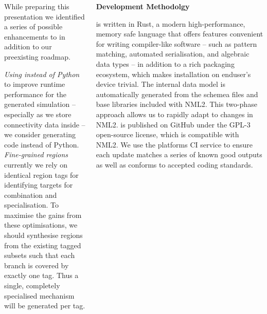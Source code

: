 \documentclass{beamer}
\begin{document}
\begin{frame}[t, fragile]
\begin{columns}
\begin{column}{0.73\textwidth}
\begin{columns}[t]
\begin{column}[t]{0.49\textwidth}
          While preparing this presentation we identified a series of possible
          enhancements to \nmlcc{} in addition to our preexisting roadmap.

          \emph{Using \cppemph{} instead of Python} to improve runtime performance for the
          generated simulation -- especially as we store connectivity data inside --
          we consider generating \cpp{} code instead of Python.\\[1.5ex]
          \emph{Fine-grained regions} currently we rely on identical region tags for
          identifying targets for combination and specialisation. To maximise the
          gains from these optimisations, we should synthesise regions from the
          existing tagged subsets such that each branch is covered by exactly one
          tag. Thus a single, completely specialised mechanism will be generated per
          tag.
        \end{column}
        \begin{column}[t]{0.49\textwidth}
          \textbf{Development Methodolgy}

          \nmlcc{} is written in Rust, a modern high-performance, memory safe
          language that offers features convenient for writing compiler-like
          software -- such as pattern matching, automated serialisation, and
          algebraic data types -- in addition to a rich packaging ecosystem, which
          makes installation on enduser's device trivial. The internal data model is
          automatically generated from the schemea files and base libraries included
          with NML2. This two-phase approach allows us to rapidly adapt to changes
          in NML2. \nmlcc{} is published on GitHub under the GPL-3 open-source
          license, which is compatible with NML2. We use the platforms CI service to
          ensure each update matches a series of known good outputs as well as
          conforms to accepted coding standards.
        \end{column}
      \end{columns}
    \end{column}


\end{columns}
\end{frame}
\end{document}
